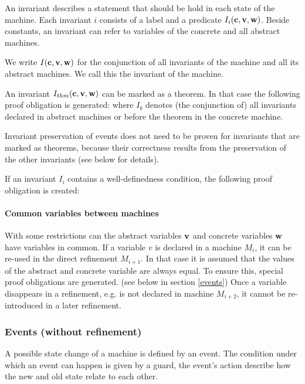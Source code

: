 An invariant describes a statement that should be hold in each state of the machine.
Each invariant $i$ consists of a label and a predicate $I_i(\textbf{c},\textbf{v},\textbf{w})$.
Beside constants, an invariant can refer to variables of the concrete and all abstract machines.

We write $I(\textbf{c},\textbf{v},\textbf{w})$ for the conjunction of all invariants
of the machine and all its abstract machines. We call this the invariant of the machine.

An invariant $I_{thm}(\textbf{c},\textbf{v},\textbf{w})$ can be marked as a theorem. In that case the following proof obligation is generated:
where $I_b$ denotes (the conjunction of) all invariants declared in abstract machines or before
the theorem in the concrete machine.

Invariant preservation of events does not need to be proven for invariants that are marked as theorems, because
 their correctness results from the preservation of the other invariants (see below for details).

If an invariant $I_i$ contains a well-definedness condition, the following proof obligation is created:

\paragraph{Common variables between machines}
With some restrictions can the abstract variables $\textbf{v}$ and concrete
  variables $\textbf{w}$ have variables in common.
If a variable $v$ is declared in a machine $M_i$, it can be re-used in the
  direct refinement $M_{i+1}$. 
In that case it is assumed that the values of the abstract and concrete variable 
  are always equal.
To ensure this, special proof obligations are generated. (see below in section \ref{events})
Once a variable disappears in a refinement, e.g. is not declared in machine $M_{i+2}$,
  it cannot be re-introduced in a later refinement.

\subsubsection{Events (without refinement)}
\label{events_no_refinement}
A possible state change of a machine is defined by an event.
The condition under which an event can happen is given by a guard, the event's action
describe how the new and old state relate to each other.

